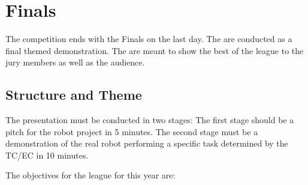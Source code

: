 \chapter{Finals}
\label{chap:finals}

The competition ends with the Finals on the last day.
The  are conducted as a final themed demonstration.
The  are meant to show the best of the league to the jury members as well as the audience.

\section{Structure and Theme}


The presentation must be conducted in two stages:
The first stage should be a pitch for the robot project in 5 minutes. 
The second stage must be a demonstration of the real robot performing a specific task determined by the TC/EC in 10 minutes.

The objectives for the league for this year are:

